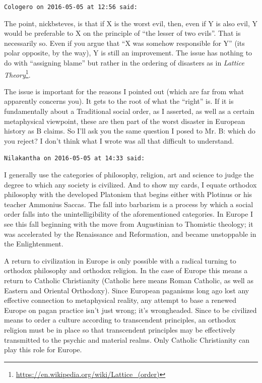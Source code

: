 \begin{footnotesize}
\begin{sffamily}
\hfill

\texttt{Cologero on 2016-05-05 at 12:56 said:}

The point, nickbsteves, is that if X is the worst evil, then, even if Y is also evil, Y would be preferable to X on the principle of ``the lesser of two evils''. That is necessarily so. Even if you argue that ``X was somehow responsible for Y'' (its polar opposite, by the way), Y is still an improvement. The issue has nothing to do with ``assigning blame'' but rather in the ordering of disasters as in \textit{Lattice Theory}\footnote{\url{https://en.wikipedia.org/wiki/Lattice_(order)}}.


The issue is important for the reasons I pointed out (which are far from what apparently concerns you). It gets to the root of what the ``right'' is. If it is fundamentally about a Traditional social order, as I asserted, as well as a certain metaphysical viewpoint, these are then part of the worst disaster in European history as B claims. So I'll ask you the same question I posed to Mr. B: which do you reject? I don't think what I wrote was all that difficult to understand.

\hfill

\texttt{Nilakantha on 2016-05-05 at 14:33 said:}

I generally use the categories of philosophy, religion, art and science to judge the degree to which any society is civilized. And to show my cards, I equate orthodox philosophy with the developed Platonism that begins either with Plotinus or his teacher Ammonius Saccas. The fall into barbarism is a process by which a social order falls into the unintelligibility of the aforementioned categories. In Europe I see this fall beginning with the move from Augustinian to Thomistic theology; it was accelerated by the Renaissance and Reformation, and became unstoppable in the Enlightenment.

A return to civilization in Europe is only possible with a radical turning to orthodox philosophy and orthodox religion. In the case of Europe this means a return to Catholic Christianity (Catholic here means Roman Catholic, as well as Eastern and Oriental Orthodoxy). Since European paganisms long ago lost any effective connection to metaphysical reality, any attempt to base a renewed Europe on pagan practice isn't just wrong; it's wrongheaded. Since to be civilized means to order a culture according to transcendent principles, an orthodox religion must be in place so that transcendent principles may be effectively transmitted to the psychic and material realms. Only Catholic Christianity can play this role for Europe.


\end{sffamily}
\end{footnotesize}
